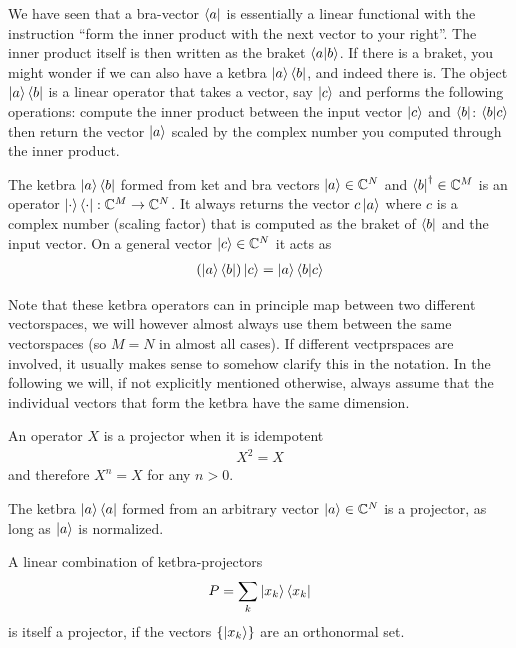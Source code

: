 We have seen that a bra-vector $\bra{a}$ is essentially a linear functional with the instruction ``form the inner product with the next vector to your right''.
The inner product itself is then written as the braket $\braket{a}{b}$.
If there is a braket, you might wonder if we can also have a ketbra $\ket{a}\bra{b}$, and indeed there is. 
The object $\ket{a}\bra{b}$ is a linear operator that takes a vector, say $\ket{c}$ and performs the following operations: compute the inner product between the input vector $\ket{c}$ and $\bra{b}$: $\braket{b}{c}$ then return the vector $\ket{a}$ scaled by the complex number you computed through the inner product. 
\begin{def*}[ketbra] The ketbra $\ket{a}\bra{b}$ formed from ket and bra vectors $\ket{a}\in\mathbb{C}^N$ and $\bra{b}^\dagger\in\mathbb{C}^M$ is an operator $\ket{\cdot}\bra{\cdot}:\mathbb{C}^M \rightarrow \mathbb{C}^N$. It always returns the vector $c\ket{a}$ where $c$ is a complex number (scaling factor) that is computed as the braket of $\bra{b}$ and the input vector. On a general vector $\ket{c}\in\mathbb{C}^N$ it acts as
\begin{align*}
    \left(\ket{a}\bra{b}\right)\ket{c} = \ket{a}\braket{b}{c}
\end{align*}
\end{def*}
Note that these ketbra operators can in principle map between two different vectorspaces, we will however almost always use them between the same vectorspaces (so $M=N$ in almost all cases). If different vectprspaces are involved, it usually makes sense to somehow clarify this in the notation. In the following we will, if not explicitly mentioned otherwise, always assume that the individual vectors that form the ketbra have the same dimension.

\begin{def*}[projector]
    An operator $X$ is a projector when it is idempotent
    \begin{align*}
        X^2 = X
    \end{align*}
    and therefore $X^n = X$ for any $n>0$.
\end{def*}

\begin{theorem*}
    The ketbra $\ket{a}\bra{a}$ formed from an arbitrary vector $\ket{a}\in\mathbb{C}^N$ is a projector, as long as $\ket{a}$ is normalized.
\end{theorem*}

\begin{theorem*}
    A linear combination of ketbra-projectors 
    \begin{align*}
        P = \sum_{k}\ket{x_k}\bra{x_k}
    \end{align*}
    is itself a projector, if the vectors $\left\{ \ket{x_k}\right\}$ are an orthonormal set.
\end{theorem*}

